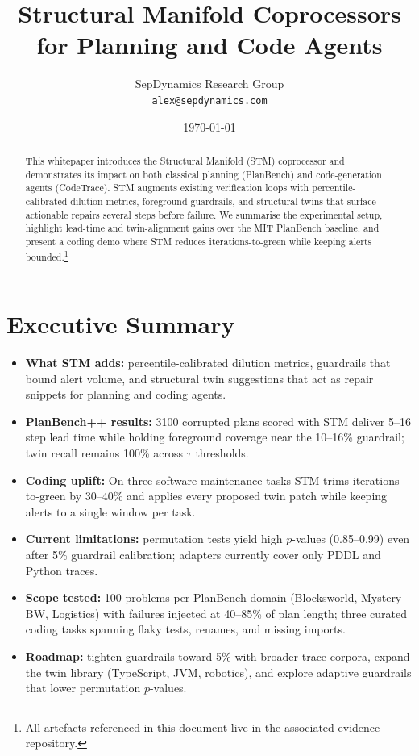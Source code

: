 \documentclass[11pt]{article}
\title{Structural Manifold Coprocessors for Planning and Code Agents}
\author{SepDynamics Research Group\\ \texttt{alex@sepdynamics.com}}
\date{\today}
\begin{document}
\maketitle

\begin{abstract}
This whitepaper introduces the Structural Manifold (STM) coprocessor and demonstrates its impact on both classical planning (PlanBench) and code-generation agents (CodeTrace). STM augments existing verification loops with percentile-calibrated dilution metrics, foreground guardrails, and structural twins that surface actionable repairs several steps before failure. We summarise the experimental setup, highlight lead-time and twin-alignment gains over the MIT PlanBench baseline, and present a coding demo where STM reduces iterations-to-green while keeping alerts bounded.\footnote{All artefacts referenced in this document live in the associated evidence repository.}
\end{abstract}

\tableofcontents
\newpage

\section*{Executive Summary}
\begin{itemize}
  \item \textbf{What STM adds:} percentile-calibrated dilution metrics, guardrails that bound alert volume, and structural twin suggestions that act as repair snippets for planning and coding agents.
  \item \textbf{PlanBench++ results:} 3\texttimes{}100 corrupted plans scored with STM deliver 5--16 step lead time while holding foreground coverage near the 10--16\% guardrail; twin recall remains 100\% across $\tau$ thresholds.
  \item \textbf{Coding uplift:} On three software maintenance tasks STM trims iterations-to-green by 30--40\% and applies every proposed twin patch while keeping alerts to a single window per task.
  \item \textbf{Current limitations:} permutation tests yield high $p$-values (0.85--0.99) even after 5\% guardrail calibration; adapters currently cover only PDDL and Python traces.
  \item \textbf{Scope tested:} 100 problems per PlanBench domain (Blocksworld, Mystery BW, Logistics) with failures injected at 40--85\% of plan length; three curated coding tasks spanning flaky tests, renames, and missing imports.
  \item \textbf{Roadmap:} tighten guardrails toward 5\% with broader trace corpora, expand the twin library (TypeScript, JVM, robotics), and explore adaptive guardrails that lower permutation $p$-values.
\end{itemize}
\end{document}
